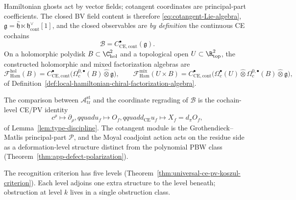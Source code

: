 \documentclass[11pt]{memoir}
\begin{document}
Hamiltonian ghosts act by vector fields; cotangent coordinates are
principal-part coefficients.  The closed
BV field content is therefore \eqref{eq:cotangent-Lie-algebra},
\(\mathfrak g=\widehat{\mathfrak h}\ltimes
\mathfrak h^\vee_{\mathrm{cont}}[1]\), and the closed observables are
\emph{by definition} the continuous CE cochains
\[
  \mathcal B
   =C^\bullet_{\mathrm{CE},\mathrm{cont}}(\mathfrak g) .
\]
On a holomorphic polydisk \(B\subset\C^2_{\mathrm{hol}}\) and a
topological open \(U\subset\R^2_{\mathrm{top}}\), the constructed
holomorphic and mixed factorization algebras are
\[
  \mathcal F^{\mathrm{hol}}_{\mathrm{Ham}}(B)
    =C^\bullet_{\mathrm{CE},\mathrm{cont}}
     \bigl(\Omega^{0,\bullet}_c(B)\widehat\otimes\mathfrak g\bigr),
  \qquad
  \mathcal F^{\mathrm{mix}}_{\mathrm{Ham}}(U\times B)
    =C^\bullet_{\mathrm{CE},\mathrm{cont}}
     \bigl(\Omega^\bullet_c(U)\widehat\otimes
       \Omega^{0,\bullet}_c(B)\widehat\otimes\mathfrak g\bigr),
\]
of
Definition~\ref{def:local-hamiltonian-chiral-factorization-algebra}.

The comparison between \(\mathcal A_{\mathrm{tr}}^{\mathrm{st}}\) and
the coordinate regrading of \(\mathcal B\) is the cochain-level CE/PV
identity
\[
  c^\rho\longmapsto\partial_\rho,qquad
  u_f\longmapsto O_f,qquad
  d_{\mathrm{CE}}u_f\longmapsto X_f=d_\pi O_f,
\]
of Lemma~\ref{lem:type-discipline}.  The cotangent module
is the Grothendieck--Matlis principal-part \(\mathcal P\), and the
Moyal coadjoint action acts on the
residue side as a deformation-level structure distinct from the
polynomial PBW class
(Theorem~\ref{thm:app-defect-polarization}).

The recognition criterion has five levels
(Theorem~\ref{thm:universal-ce-pv-koszul-criterion}).  Each level
adjoins one extra structure to the level beneath; obstruction at level
\(k\) lives in a single obstruction class.
\end{document}
